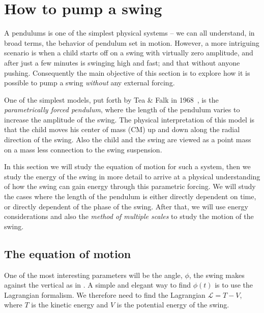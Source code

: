 \documentclass[11pt,letter, swedish, english,%
]{article}
\begin{document}





\section{How to pump a swing}
A pendulums is one of the simplest physical systems -- we can all
understand, in broad terms, the behavior of pendulum set in
motion. However, a more intriguing scenario is when a child starts off
on a swing with virtually zero amplitude, and after just a few minutes
is swinging high and fast; and that without anyone pushing.
Consequently the main objective of this section is to explore how it
is possible to pump a swing \emph{without} any external forcing. 

One of the simplest models, put forth by Tea \& Falk in
1968~\cite{Tea_Falk_1968}, is the \emph{parametrically forced
  pendulum}, where the length of the pendulum varies to increase the
amplitude of the swing. The physical interpretation of this model is
that the child moves his center of mass (CM) up and down along the radial
direction of the swing. Also the child and the swing are viewed as a
point mass on a mass less connection to the swing suspension. 

In this section we will study the equation of motion for such a system,
then we study the energy of the swing in more detail to arrive at a
physical understanding of how the swing can gain energy through this
parametric forcing. We will study the cases where the length of the
pendulum is either directly dependent on time, or directly dependent
of the phase of the swing.
After that, we will use energy considerations and also the
\emph{method of multiple scales} to study the motion of the swing.

\subsection{The equation of motion}
One of the most interesting parameters will be the angle, $\phi$,
the swing makes against the vertical as in . 
A simple and elegant way to find $\phi(t)$ is to use the Lagrangian
formalism. We therefore need to find the Lagrangian $\mathcal{L}=T-V$,
where $T$ is the kinetic energy and $V$ is the potential energy of the
swing. 
\end{document}
